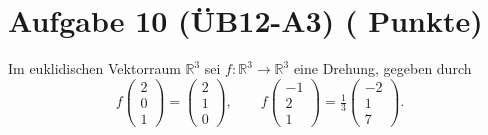 \documentclass[11pt, a4paper]{article}
\newcommand{\aufgabe}[2]{%
  \section*{\Large\bfseries Aufgabe #1%
  \if\relax\detokenize{#2}\relax\else \hfill\normalfont\normalsize(#2 Punkte)\fi}%
  \vspace{-1.5ex}
}
\begin{document}
\aufgabe{10 (ÜB12-A3)}{}
Im euklidischen Vektorraum $\mathbb{R}^3$ sei $f:\mathbb{R}^3\to\mathbb{R}^3$ eine Drehung, gegeben durch
\[
f\!\begin{pmatrix}2\\0\\1\end{pmatrix}=\begin{pmatrix}2\\1\\0\end{pmatrix},\qquad
f\!\begin{pmatrix}-1\\2\\1\end{pmatrix}=\tfrac{1}{3}\begin{pmatrix}-2\\1\\7\end{pmatrix}.
\]
\end{document}
